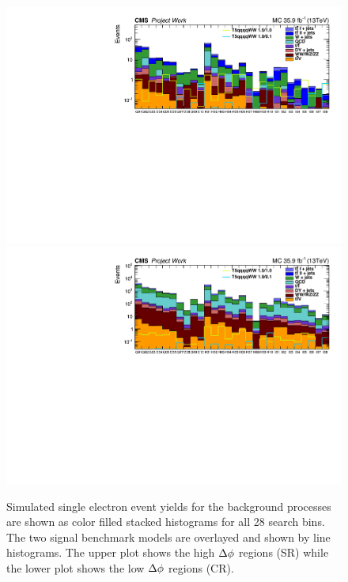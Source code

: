  \begin{figure}[!hbt]
    \begin{center}
 \includegraphics[width=0.95 \textwidth]{Plots/analysis/signalRegions/MC__ele__SR}\\
   \includegraphics[width=0.95 \textwidth]{Plots/analysis/signalRegions/MC__ele__CR}
  \caption{ \label{fig:MCcounts_ele} Simulated single electron event yields for the background processes are shown as color filled stacked histograms for all 28 search bins. The two signal benchmark models are overlayed and shown by line histograms. The upper plot shows the high $\Delta \phi$ regions (SR) while the lower plot shows the low $\Delta \phi$ regions (CR).
  }
   \end{center}
\end{figure}